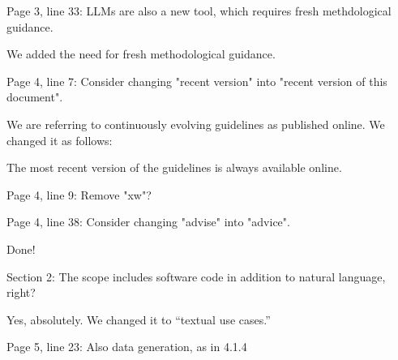 \documentclass[12pt,english]{reviewresponse}
\begin{document}
\begin{revcomment}
Page 3, line 33: LLMs are also a new tool, which requires fresh methdological guidance.
\end{revcomment}
\begin{revresponse}
    We added the need for fresh methodological guidance.
\end{revresponse}

\begin{revcomment}
Page 4, line 7: Consider changing "recent version" into "recent version of this document".
\end{revcomment}
\begin{revresponse}
We are referring to continuously evolving guidelines as published online. We changed it as follows:
	\begin{changes}
		The most recent version of the guidelines is always available online.
	\end{changes}
    
\end{revresponse}

\begin{revcomment}
Page 4, line 9: Remove "xw"?


Page 4, line 38: Consider changing "advise" into "advice".
\end{revcomment}
\begin{revresponse}
    Done!
\end{revresponse}

\begin{revcomment}
Section 2: The scope includes software code in addition to natural language, right?
\end{revcomment}
\begin{revresponse}
    Yes, absolutely. We changed it to ``textual use cases.''
\end{revresponse}

\begin{revcomment}
Page 5, line 23: Also data generation, as in 4.1.4
\end{revcomment}
\begin{revresponse}
    
\end{revresponse}
\end{document}
